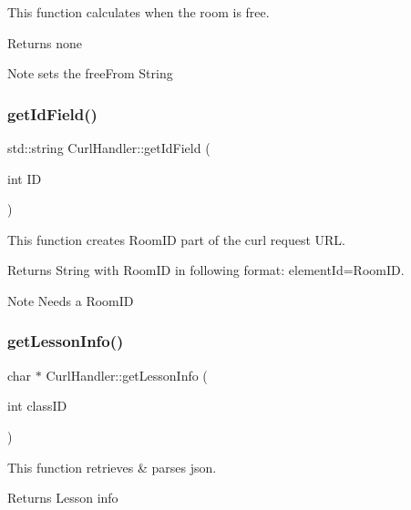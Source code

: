 This function calculates when the room is free. 

\begin{DoxyReturn}{Returns}
none 
\end{DoxyReturn}
\begin{DoxyNote}{Note}
sets the free\+From String 
\end{DoxyNote}
\mbox{\label{classCurlHandler_a26d8a6f384d54fd7af70fde33232531a}} 
\subsubsection{\texorpdfstring{get\+Id\+Field()}{getIdField()}}
{\footnotesize\ttfamily std\+::string Curl\+Handler\+::get\+Id\+Field (\begin{DoxyParamCaption}\item[{int}]{ID }\end{DoxyParamCaption})}



This function creates Room\+ID part of the curl request U\+RL. 

\begin{DoxyReturn}{Returns}
String with Room\+ID in following format\+: element\+Id=Room\+ID. 
\end{DoxyReturn}
\begin{DoxyNote}{Note}
Needs a Room\+ID 
\end{DoxyNote}
\mbox{\label{classCurlHandler_a8f82086fdc6993eb9068a25632652fb0}} 
\subsubsection{\texorpdfstring{get\+Lesson\+Info()}{getLessonInfo()}}
{\footnotesize\ttfamily char $\ast$ Curl\+Handler\+::get\+Lesson\+Info (\begin{DoxyParamCaption}\item[{int}]{class\+ID }\end{DoxyParamCaption})}



This function retrieves \& parses json. 

\begin{DoxyReturn}{Returns}
Lesson info 
\end{DoxyReturn}
\mbox{\label{classCurlHandler_acd45a047ecf8bad0977f8e890914a59a}} 
